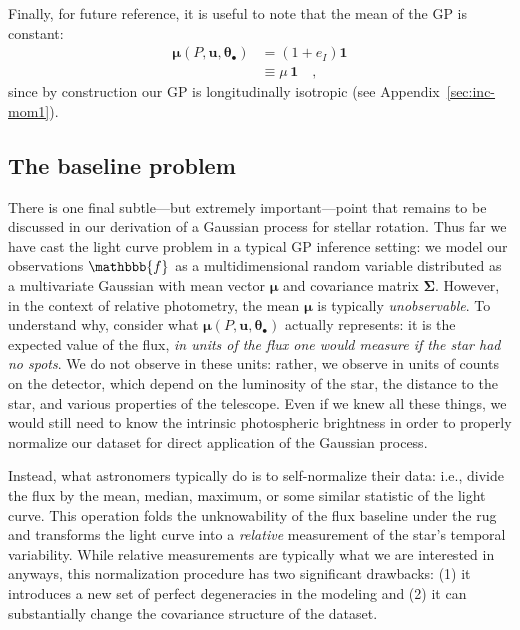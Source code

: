 \documentclass[modern]{aastex62}
\begin{document}
%
Finally, for future reference, it is useful to note that the mean of the GP
is constant:
%
\begin{align}
    \pmb{\mu}(P, \mathbf{u}, \pmb{\theta}_\bullet)
     & =  (1 + e_I)\mathbf{1}
    \nonumber                 \\
     & \equiv
    \mu \, \mathbf{1}
    \quad,
\end{align}
%
since by construction our GP is longitudinally isotropic
(see Appendix~\ref{sec:inc-mom1}).

\subsection{The baseline problem}
\label{sec:baseline}

There is one final subtle---but extremely important---point that remains to
be discussed in our derivation of a Gaussian process for stellar
rotation. Thus far we have cast the light curve problem in a typical GP inference
setting: we model our observations $\mathbbb{f}$ as
a multidimensional random variable distributed as a multivariate Gaussian with mean vector
$\pmb{\mu}$ and covariance matrix $\pmb{\Sigma}$. However, in the context of
relative photometry, the mean $\pmb{\mu}$ is typically \emph{unobservable}.
%
To understand why, consider what
$\pmb{\mu}(P, \mathbf{u}, \pmb{\theta}_\bullet)$ actually represents:
it is the expected value
of the flux,
\emph{in units of the flux one would measure if the star had no spots}.
We do not observe in these units: rather, we observe in units of counts on
the detector, which depend on the luminosity of the star, the distance to
the star, and various properties of the telescope. Even if we knew all these
things, we would still need to know the intrinsic photospheric brightness
in order to properly normalize our dataset for direct application of
the Gaussian process.

Instead, what astronomers typically do is to self-normalize their data:
i.e., divide the flux by the mean, median, maximum, or some similar
statistic of the light curve. This operation folds the unknowability of
the flux baseline under the rug and transforms the light curve into a \emph{relative}
measurement of the star's temporal variability. While relative measurements
are typically what we are interested in anyways, this normalization procedure
has two significant drawbacks: (1) it introduces a new set of perfect degeneracies
in the modeling and (2) it can substantially change the covariance structure
of the dataset.
\end{document}
